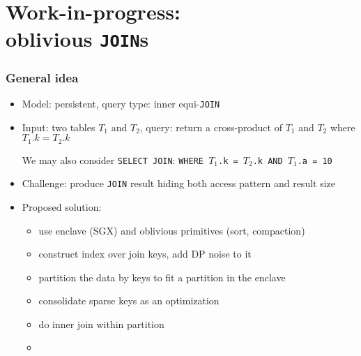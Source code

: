 \section{Work-in-progress: \\ oblivious \texttt{JOIN}s}

	\begin{frame}[label={frame:oblivious-joins}]

		\frametitle{General idea}

		\begin{itemize}
			\item<1->
				Model: \alert{persistent}, query type: \alert{inner equi-\texttt{JOIN}}

			\item<2->
				Input: two tables $T_1$ and $T_2$, query: return a cross-product of $T_1$ and $T_2$ where $T_1.k = T_2.k$ \\
				\begin{small}
					We may also consider \texttt{SELECT JOIN}: \texttt{WHERE $T_1$.k = $T_2$.k AND $T_1$.a = 10}
				\end{small}

			\item<3->
				\alert{Challenge}: produce \texttt{JOIN} result hiding both access pattern and result size

			\item<4->
				\alert{Proposed solution}:
				\begin{itemize}
					\item use enclave (SGX) and oblivious primitives (sort, compaction)
					\item construct index over join keys, add DP noise to it
					\item partition the data by keys to fit a partition in the enclave
					\item consolidate sparse keys as an optimization
					\item do inner join within partition
					\item[] \hyperlink{frame:appendix:joins-detailed}{}
				\end{itemize}

		\end{itemize}

	\end{frame}

